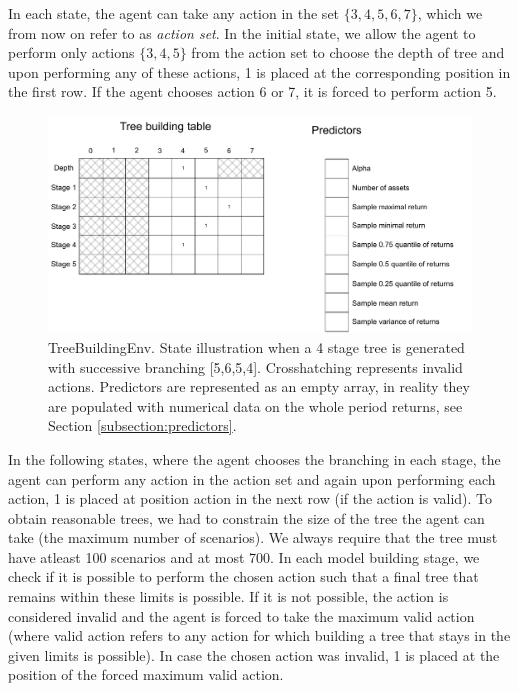  In each state, the agent can take any action in the set $\{3,4,5,6,7\}$, which we from now on refer to as \textit{action set}. In the initial state, we allow the agent to perform only actions $\{3,4,5\}$ from the action set to choose the depth of tree and upon performing any of these actions, 1 is placed at the corresponding position in the first row. If the agent chooses action 6 or 7, it is forced to perform action 5. 


\begin{figure}[H]
  \includegraphics[width=\linewidth]{../img/Treebuildingenv_graph.pdf}
  \caption{TreeBuildingEnv. State illustration when a 4 stage tree is generated with successive branching [5,6,5,4]. Crosshatching represents invalid actions. Predictors are represented as an empty array, in reality they are populated with numerical data on the whole period returns, see Section \ref{subsection:predictors}.}
  \label{fig:treebuildingenv}
\end{figure}


In the following states, where the agent chooses the branching in each stage, the agent can perform any action in the action set and again upon performing each action, 1 is placed at position action in the next row (if the action is valid). To obtain reasonable trees, we had to constrain the size of the tree the agent can take (the maximum number of scenarios). We always require that the tree must have atleast 100 scenarios and at most 700. In each model building stage, we check if it is possible to perform the chosen action such that a final tree that remains within these limits is possible. If it is not possible, the action is considered invalid and the agent is forced to take the maximum valid action (where valid action refers to any action for which building a tree that stays in the given limits is possible). In case the chosen action was invalid, 1 is placed at the position of the forced maximum valid action.

